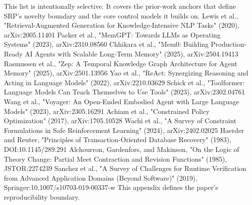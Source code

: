 {}
\markdownRendererSectionEnd \markdownRendererSectionBegin
{}\markdownRendererInterblockSeparator
{}This list is intentionally selective. It covers the prior-work anchors that define SRP's novelty boundary and the core control models it builds on.\markdownRendererInterblockSeparator
{}\markdownRendererUlBeginTight
\markdownRendererUlItem Lewis et al., "Retrieval-Augmented Generation for Knowledge-Intensive NLP Tasks" (2020), arXiv:2005.11401\markdownRendererUlItemEnd 
\markdownRendererUlItem Packer et al., "MemGPT: Towards LLMs as Operating Systems" (2023), arXiv:2310.08560\markdownRendererUlItemEnd 
\markdownRendererUlItem Chhikara et al., "Mem0: Building Production-Ready AI Agents with Scalable Long-Term Memory" (2025), arXiv:2504.19413\markdownRendererUlItemEnd 
\markdownRendererUlItem Rasmussen et al., "Zep: A Temporal Knowledge Graph Architecture for Agent Memory" (2025), arXiv:2501.13956\markdownRendererUlItemEnd 
\markdownRendererUlItem Yao et al., "ReAct: Synergizing Reasoning and Acting in Language Models" (2022), arXiv:2210.03629\markdownRendererUlItemEnd 
\markdownRendererUlItem Schick et al., "Toolformer: Language Models Can Teach Themselves to Use Tools" (2023), arXiv:2302.04761\markdownRendererUlItemEnd 
\markdownRendererUlItem Wang et al., "Voyager: An Open-Ended Embodied Agent with Large Language Models" (2023), arXiv:2305.16291\markdownRendererUlItemEnd 
\markdownRendererUlItem Achiam et al., "Constrained Policy Optimization" (2017), arXiv:1705.10528\markdownRendererUlItemEnd 
\markdownRendererUlItem Wachi et al., "A Survey of Constraint Formulations in Safe Reinforcement Learning" (2024), arXiv:2402.02025\markdownRendererUlItemEnd 
\markdownRendererUlItem Haerder and Reuter, "Principles of Transaction-Oriented Database Recovery" (1983), DOI:10.1145/289.291\markdownRendererUlItemEnd 
\markdownRendererUlItem Alchourron, Gardenfors, and Makinson, "On the Logic of Theory Change: Partial Meet Contraction and Revision Functions" (1985), JSTOR:2274239\markdownRendererUlItemEnd 
\markdownRendererUlItem Sanchez et al., "A Survey of Challenges for Runtime Verification from Advanced Application Domains (Beyond Software)" (2019), Springer:10.1007/s10703-019-00337-w\markdownRendererUlItemEnd 
\markdownRendererUlEndTight \markdownRendererInterblockSeparator
{}
\markdownRendererSectionEnd \markdownRendererSectionBegin
{}\markdownRendererInterblockSeparator
{}This appendix defines the paper's reproducibility boundary.\markdownRendererSoftLineBreak
